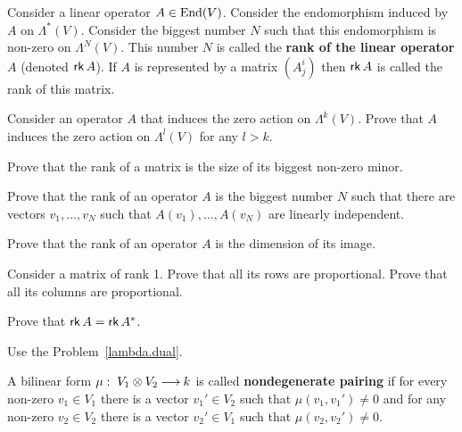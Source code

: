 \documentclass[12pt]{article}
\begin{document}
\begin{opredelenie}
Consider a linear operator $A\in \operatorname{End}(V)$. Consider the endomorphism
induced by $A$ on $\Lambda^*(V)$. Consider the biggest number $N$
such that this endomorphism is non-zero on $\Lambda^N(V)$. This number 
$N$ is called the {\bf rank of the linear operator $A$} (denoted $\operatorname{\sf rk}
A$). If $A$ is represented by a matrix $(A^i_j)$ then $\operatorname{\sf rk} A$ is
called the rank of this matrix.
\end{opredelenie}

\begin{zadacha}[!]
  Consider an operator $A$ that induces the zero action on
  $\Lambda^k(V)$.  Prove that $A$ induces the zero action on
  $\Lambda^l(V)$ for any $l>k$.
\end{zadacha}

\begin{zadacha}
Prove that the rank of a matrix is the size of its biggest non-zero
minor.
\end{zadacha}

\begin{zadacha} 
Prove that the rank of an operator $A$ is the biggest number $N$ such
that there are vectors $v_1, \dots, v_N$ such that $A(v_1), \dots,
A(v_N)$ are linearly independent. 
\end{zadacha}

\begin{zadacha}[!]
Prove that the rank of  an operator $A$ is the dimension of its image.
\end{zadacha}

\begin{zadacha} 
Consider a matrix of rank 1. Prove that all its rows are
proportional. Prove that all its columns are proportional. 
\end{zadacha}

\begin{zadacha} 
Prove that $\operatorname{\sf rk} A = \operatorname{\sf rk} A^*$.
\end{zadacha}

\begin{ukazanie}
Use the Problem~\ref{lambda.dual}.
\end{ukazanie}

\begin{opredelenie}
A bilinear form
$\mu:\; V_1 \otimes V_2 {\:\longrightarrow\:} k$ is called
{\bf nondegenerate pairing} if for every non-zero $v_1\in V_1$
there is a vector $v_1'\in V_2$ such that 
$\mu(v_1, v_1')\neq 0$ and for any non-zero
$v_2\in V_2$ there is a vector $v_2'\in V_1$ such that
$\mu(v_2, v_2')\neq 0$.
\end{opredelenie}
\end{document}
